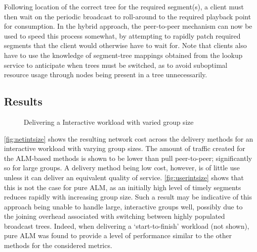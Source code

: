 Following location of the correct tree for the required segment(s), a client must then wait on the periodic broadcast to roll-around to the required playback point for consumption. In the hybrid approach, the peer-to-peer mechanism can now be used to speed this process somewhat, by attempting to rapidly patch required segments that the client would otherwise have to wait for. Note that clients also have to use the knowledge of segment-tree mappings obtained from the lookup service to anticipate when trees must be switched, as to avoid suboptimal resource usage through nodes being present in a tree unnecessarily.

\subsection{Results}

\begin{figure}[t]
    \centering

    \caption{Delivering a Interactive workload with varied group size}
\end{figure}

\autoref{fig:netintsize} shows the resulting network cost across the delivery methods for an interactive workload with varying group sizes. The amount of traffic created for the ALM-based methods is shown to be lower than pull peer-to-peer; significantly so for large groups. A delivery method being low cost, however, is of little use unless it can deliver an equivalent quality of service. \autoref{fig:userintsize} shows that this is not the case for pure ALM, as an initially high level of timely segments reduces rapidly with increasing group size. Such a result may be indicative of this approach being unable to handle large, interactive groups well, possibly due to the joining overhead associated with switching between highly populated broadcast trees. Indeed, when delivering a `start-to-finish' workload (not shown), pure ALM was found to provide a level of performance similar to the other methods for the considered metrics.

